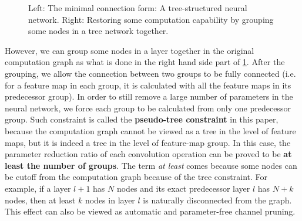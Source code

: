 \documentclass{acmtog} %
\begin{document}
\begin{figure}
\centering
{}
\caption{Left: The minimal connection form: A tree-structured neural network. Right: Restoring some computation capability by grouping some nodes in a tree network together.}
\label{fig:tree}
\end{figure}

However, we can group some nodes in a layer together in the original computation graph as what is done in the right hand side part of \ref{fig:tree}. After the grouping, we allow the connection between two groups to be fully connected (i.e. for a feature map in each group, it is calculated with all the feature maps in its predecessor group). In order to still remove a large number of parameters in the neural network, we force each group to be calculated from only one predecessor group. Such constraint is called the \textbf{pseudo-tree constraint} in this paper, because the computation graph cannot be viewed as a tree in the level of feature maps, but it is indeed a tree in the level of feature-map group. In this case, the parameter reduction ratio of each convolution operation can be proved to be \textbf{at least the number of groups}. The term \emph{at least} comes because some nodes can be cutoff from the computation graph because of the tree constraint. For example, if a layer $l+1$ has $N$ nodes and its exact predecessor layer $l$ has $N+k$ nodes, then at least $k$ nodes in layer $l$ is naturally disconnected from the graph. This effect can also be viewed as automatic and parameter-free channel pruning.
\end{document}

